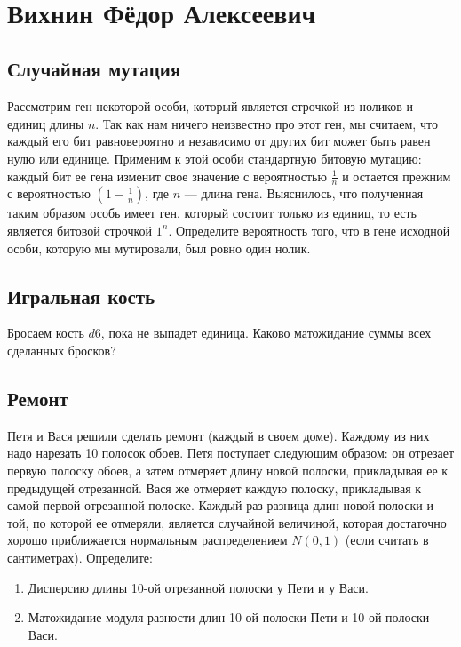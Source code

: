 \documentclass[12pt]{article}
\begin{document}
\newpage
~
\newpage
\section{Вихнин Фёдор Алексеевич}

\subsection{Случайная мутация}
Рассмотрим ген некоторой особи, который является строчкой из ноликов и единиц длины $n$. Так как нам ничего неизвестно про этот ген, мы считаем, что каждый его бит равновероятно и независимо от других бит может быть равен нулю или единице. Применим к этой особи стандартную битовую мутацию: каждый бит ее гена изменит свое значение с вероятностью $\frac{1}{n}$ и остается прежним с вероятностью $(1 - \frac{1}{n})$, где $n$ --- длина гена. Выяснилось, что полученная таким образом особь имеет ген, который состоит только из единиц, то есть является битовой строчкой $1^n$. Определите вероятность того, что в гене исходной особи, которую мы мутировали, был ровно один нолик.

\subsection{Игральная кость}Бросаем кость $d6$, пока не выпадет единица. Каково матожидание суммы всех сделанных бросков?

\subsection{Ремонт}
Петя и Вася решили сделать ремонт (каждый в своем доме). Каждому из них надо нарезать 10 полосок обоев. Петя поступает следующим образом: он отрезает первую полоску обоев, а затем отмеряет длину новой полоски, прикладывая ее к предыдущей отрезанной. Вася же отмеряет каждую полоску, прикладывая к самой первой отрезанной полоске. Каждый раз разница длин новой полоски и той, по которой ее отмеряли, является случайной величиной, которая достаточно хорошо приближается нормальным распределением $N(0, 1)$ (если считать в сантиметрах). Определите:
\begin{enumerate}
    \item Дисперсию длины 10-ой отрезанной полоски у Пети и у Васи.
    \item Матожидание модуля разности длин 10-ой полоски Пети и 10-ой полоски Васи. 
\end{enumerate}
\end{document}
